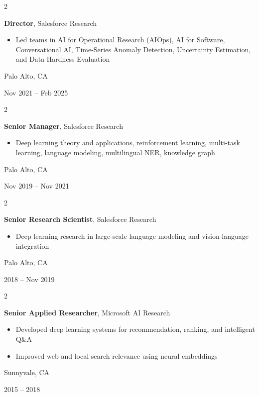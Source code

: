 \documentclass[10pt, letterpaper]{article}
\newenvironment{highlights}{
    \begin{itemize}[
        topsep=0.10 cm,
        parsep=0.10 cm,
        partopsep=0pt,
        itemsep=0pt,
        leftmargin=0.4 cm + 10pt
    ]
}{
    \end{itemize}
}
\newenvironment{twocolentry}[2][]{
    \onecolentry
    \def\secondColumn{#2}
    \setcolumnwidth{\fill, 4.5 cm}
    \begin{paracol}{2}
}{
    \switchcolumn \raggedleft \secondColumn
    \end{paracol}
    \endonecolentry
}
\begin{document}
    \vspace{0.2 cm}

    \begin{twocolentry}{
        Palo Alto, CA

        Nov 2021 -- Feb 2025
    }
        \textbf{\color{primaryColor}Director}, Salesforce Research
        \begin{highlights}
            \item Led teams in AI for Operational Research (AIOps), AI for Software, Conversational AI, Time-Series Anomaly Detection, Uncertainty Estimation, and Data Hardness Evaluation
        \end{highlights}
    \end{twocolentry}

    \vspace{0.2 cm}

    \begin{twocolentry}{
        Palo Alto, CA

        Nov 2019 -- Nov 2021
    }
        \textbf{\color{primaryColor}Senior Manager}, Salesforce Research
        \begin{highlights}
            \item Deep learning theory and applications, reinforcement learning, multi-task learning, language modeling, multilingual NER, knowledge graph
        \end{highlights}
    \end{twocolentry}

    \vspace{0.2 cm}

    \begin{twocolentry}{
        Palo Alto, CA

        2018 -- Nov 2019
    }
        \textbf{\color{primaryColor}Senior Research Scientist}, Salesforce Research
        \begin{highlights}
            \item Deep learning research in large-scale language modeling and vision-language integration
        \end{highlights}
    \end{twocolentry}

    \vspace{0.2 cm}

    \begin{twocolentry}{
        Sunnyvale, CA

        2015 -- 2018
    }
        \textbf{Senior Applied Researcher}, Microsoft AI Research
        \begin{highlights}
            \item Developed deep learning systems for recommendation, ranking, and intelligent Q\&A
            \item Improved web and local search relevance using neural embeddings
        \end{highlights}
    \end{twocolentry}
\end{document}
